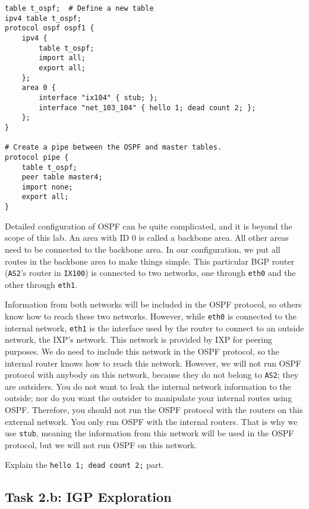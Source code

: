 \begin{lstlisting}
table t_ospf;  # Define a new table 
ipv4 table t_ospf;
protocol ospf ospf1 {
    ipv4 {
        table t_ospf;
        import all;
        export all;
    };
    area 0 {
        interface "ix104" { stub; };
        interface "net_103_104" { hello 1; dead count 2; };
    };
}

# Create a pipe between the OSPF and master tables. 
protocol pipe {
    table t_ospf;
    peer table master4;
    import none;
    export all;
}
\end{lstlisting}

Detailed configuration of OSPF can be quite complicated, and it is beyond the
scope of this lab.
An area with ID 0 is called a backbone area. All other areas need
to be connected to the backbone area. In our configuration, we put all routes
in the backbone area to make things simple. This
particular BGP router (\texttt{AS2}'s router in \texttt{IX100})
is connected to two networks, one through \texttt{eth0} and the other
through \texttt{eth1}.

Information from both networks will be included in the OSPF protocol,
so others know how to reach these two networks. However,
while \texttt{eth0} is connected to the internal network,
\texttt{eth1} is the interface used by the router
to connect to an outside network, the IXP's network. This network is provided
by IXP for peering purposes. We do need to include this network in the OSPF
protocol, so the internal router knows how to reach this network. However, we
will not run OSPF protocol with anybody on this network, because they
do not belong to \texttt{AS2}; they are outsiders.
You do not want to leak the internal network information to the outside;
nor do you want the outsider to manipulate your internal routes using OSPF.
Therefore, you should not run the OSPF protocol with
the routers on this external network.
You only run OSPF with the internal routers.
That is why we use \texttt{stub}, meaning the information from this network
will be used in the OSPF protocol, but we will not run OSPF on
this network.

Explain the \texttt{hello 1; dead count 2;} part. 



\subsection{Task 2.b: IGP Exploration} 

